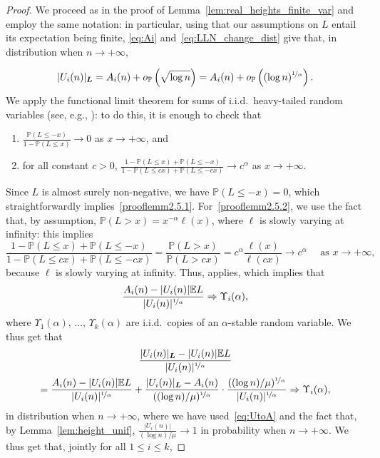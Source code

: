 \documentclass[AHL,Unicode,longabstracts,published]{cedram}
\newcommand{\bs}{\ensuremath{\boldsymbol}}
\newcommand{\op}{{o_{\bbP}}}
\newcommand{\bbP}{\mathbb{P}}
\newcommand{\bbE}{\mathbb{E}}
\newcommand*{\romanenumi}{\renewcommand*{\theenumi}{\roman{enumi}}}
\begin{document}
\begin{proof}
We proceed as in the proof of Lemma~\ref{lem:real_heights_finite_var} and employ the same notation: in particular, using that our assumptions on $L$ entail its expectation being finite, \eqref{eq:Ai} and~\eqref{eq:LLN_change_dist} give that, in distribution when $n\to+\infty$,

\begin{equation}\label{eq:UtoA}
|U_i(n)|_{\bs L} = A_i(n)+o_{\bbP}\left(\sqrt{\log n}\right) = A_i(n)+\op\left((\log n)^{\nicefrac1\alpha}\right).
\end{equation}
We apply the functional limit theorem for sums of i.i.d.\ heavy-tailed random variables (see, e.g., \cite[\S~35, Theorem~2]{GK}): to do this, it is enough to check that
\begin{enumerate}\romanenumi
\item\label{prooflemm2.5.1} $\frac{\bbP(L\leq -x)}{1-\bbP(L\leq x)}\to 0$ as $x\to+\infty$, and
\item\label{prooflemm2.5.2} for all constant $c>0$, $\frac{1-\bbP(L\leq x)+\bbP(L\leq -x)}{1-\bbP(L\leq cx)+\bbP(L\leq -cx)}\to c^\alpha$ as $x\to+\infty$.
\end{enumerate}
Since $L$ is almost surely non-negative, we have $\bbP(L\leq -x) = 0$, which straightforwardly implies~\eqref{prooflemm2.5.1}. For~\eqref{prooflemm2.5.2}, we use the fact that, by assumption, $\bbP(L> x) = x^{-\alpha}\ell(x)$, where $\ell$ is slowly varying at infinity: this implies
\[
\frac{1-\bbP(L\leq x)+\bbP(L\leq -x)}{1-\bbP(L\leq cx)+\bbP(L\leq -cx)} = \frac{\bbP(L>x)}{\bbP(L>cx)} = c^\alpha\frac{\ell(x)}{\ell(cx)}\to c^\alpha \quad\text{ as }x\to+\infty,
\]
because $\ell$ is slowly varying at infinity. Thus, \cite[\S~25, Theorem~2]{GK} applies, which implies that
\[
\frac{A_i(n)-|U_i(n)|\bbE L}{|U_i(n)|^{\nicefrac1\alpha}}\Rightarrow \Upsilon_i(\alpha),
\]
where $\Upsilon_1(\alpha), \,\ldots,\, \Upsilon_k(\alpha)$ are i.i.d.\ copies of an $\alpha$-stable random variable. We thus get that
\begin{multline*}
\frac{|U_i(n)|_{\bs L} - |U_i(n)|\bbE L}{|U_i(n)|^{\nicefrac1\alpha}}\\
= \frac{A_i(n)-|U_i(n)|\bbE L}{|U_i(n)|^{\nicefrac1\alpha}} + \frac{|U_i(n)|_{\bs L}-A_i(n)}{((\log n)/\mu)^{\nicefrac1\alpha}}
\cdot\frac{((\log n)/\mu)^{\nicefrac1\alpha}}{|U_i(n)|^{\nicefrac1\alpha}}
\Rightarrow \Upsilon_i(\alpha),
\end{multline*}
in distribution when $n\to+\infty$, where we have used~\eqref{eq:UtoA} and the fact that, by Lemma~\ref{lem:height_unif}, $\frac{|U_i(n)|}{(\log n)/\mu} \to 1$ in probability when $n\to+\infty$. We thus get that, jointly for all $1\leq i\leq k$,

\end{proof}
\end{document}
